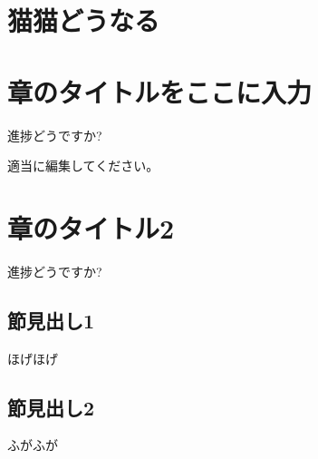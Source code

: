 \documentclass[
]{book}
\begin{document}
\chapter{猫猫どうなる}\label{ux732bux732bux3069ux3046ux306aux308b}

\chapter{章のタイトルをここに入力}\label{ux7ae0ux306eux30bfux30a4ux30c8ux30ebux3092ux3053ux3053ux306bux5165ux529b}

進捗どうですか?

適当に編集してください。

\chapter{章のタイトル2}\label{ux7ae0ux306eux30bfux30a4ux30c8ux30eb2}

進捗どうですか?

\section{節見出し1}\label{ux7bc0ux898bux51faux30571}

ほげほげ

\section{節見出し2}\label{ux7bc0ux898bux51faux30572}

ふがふが
\end{document}

